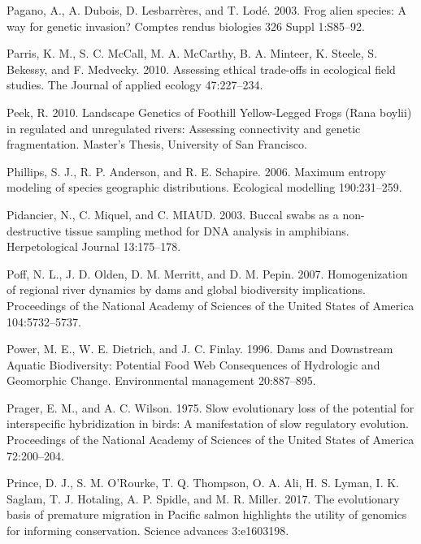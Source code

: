 \documentclass[proquest,12pt,final]{ucthesis-CA2012} %
\begin{document}
\begin{ucmainmatter}
\leavevmode\hypertarget{ref-pagano_frog_2003}{}%
Pagano, A., A. Dubois, D. Lesbarrères, and T. Lodé. 2003. Frog alien
species: A way for genetic invasion? Comptes rendus biologies 326 Suppl
1:S85--92.

\leavevmode\hypertarget{ref-parris_assessing_2010}{}%
Parris, K. M., S. C. McCall, M. A. McCarthy, B. A. Minteer, K. Steele,
S. Bekessy, and F. Medvecky. 2010. Assessing ethical trade-offs in
ecological field studies. The Journal of applied ecology 47:227--234.

\leavevmode\hypertarget{ref-peek_landscape_2010}{}%
Peek, R. 2010. Landscape Genetics of Foothill Yellow-Legged Frogs (Rana
boylii) in regulated and unregulated rivers: Assessing connectivity and
genetic fragmentation. Master's Thesis, University of San Francisco.

\leavevmode\hypertarget{ref-phillips_maximum_2006}{}%
Phillips, S. J., R. P. Anderson, and R. E. Schapire. 2006. Maximum
entropy modeling of species geographic distributions. Ecological
modelling 190:231--259.

\leavevmode\hypertarget{ref-pidancier_buccal_2003}{}%
Pidancier, N., C. Miquel, and C. MIAUD. 2003. Buccal swabs as a
non-destructive tissue sampling method for DNA analysis in amphibians.
Herpetological Journal 13:175--178.

\leavevmode\hypertarget{ref-poff_homogenization_2007}{}%
Poff, N. L., J. D. Olden, D. M. Merritt, and D. M. Pepin. 2007.
Homogenization of regional river dynamics by dams and global
biodiversity implications. Proceedings of the National Academy of
Sciences of the United States of America 104:5732--5737.

\leavevmode\hypertarget{ref-power_dams_1996}{}%
Power, M. E., W. E. Dietrich, and J. C. Finlay. 1996. Dams and
Downstream Aquatic Biodiversity: Potential Food Web Consequences of
Hydrologic and Geomorphic Change. Environmental management 20:887--895.

\leavevmode\hypertarget{ref-prager_slow_1975}{}%
Prager, E. M., and A. C. Wilson. 1975. Slow evolutionary loss of the
potential for interspecific hybridization in birds: A manifestation of
slow regulatory evolution. Proceedings of the National Academy of
Sciences of the United States of America 72:200--204.

\leavevmode\hypertarget{ref-prince_evolutionary_2017}{}%
Prince, D. J., S. M. O'Rourke, T. Q. Thompson, O. A. Ali, H. S. Lyman,
I. K. Saglam, T. J. Hotaling, A. P. Spidle, and M. R. Miller. 2017. The
evolutionary basis of premature migration in Pacific salmon highlights
the utility of genomics for informing conservation. Science advances
3:e1603198.


\end{ucmainmatter}
\end{document}
